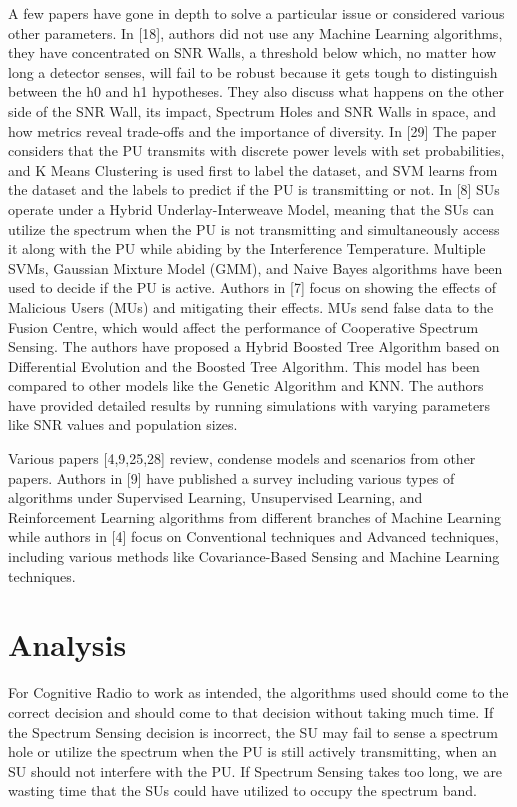 A few papers have gone in depth to solve a particular issue or considered various other parameters. In [18], authors did not use any Machine Learning algorithms, they have concentrated on SNR Walls, a threshold below which, no matter how long a detector senses, will fail to be robust because it gets tough to distinguish between the h0 and h1 hypotheses. They also discuss what happens on the other side of the SNR Wall, its impact, Spectrum Holes and SNR Walls in space, and how metrics reveal trade-offs and the importance of diversity. In [29] The paper considers that the PU transmits with discrete power levels with set probabilities, and K Means Clustering is used first to label the dataset, and SVM learns from the dataset and the labels to predict if the PU is transmitting or not. In [8] SUs operate under a Hybrid Underlay-Interweave Model, meaning that the SUs can utilize the spectrum when the PU is not transmitting and simultaneously access it along with the PU while abiding by the Interference Temperature. Multiple SVMs, Gaussian Mixture Model (GMM), and Naive Bayes algorithms have been used to decide if the PU is active. Authors in [7] focus on showing the effects of Malicious Users (MUs) and mitigating their effects. MUs send false data to the Fusion Centre, which would affect the performance of Cooperative Spectrum Sensing. The authors have proposed a Hybrid Boosted Tree Algorithm based on Differential Evolution and the Boosted Tree Algorithm. This model has been compared to other models like the Genetic Algorithm and KNN. The authors have provided detailed results by running simulations with varying parameters like SNR values and population sizes.

Various papers [4,9,25,28] review, condense models and scenarios from other papers. Authors in [9] have published a survey including various types of algorithms under Supervised Learning, Unsupervised Learning, and Reinforcement Learning algorithms from different branches of Machine Learning while authors in [4] focus on Conventional techniques and Advanced techniques, including various methods like Covariance-Based Sensing and Machine Learning techniques.


\section{Analysis}
For Cognitive Radio to work as intended, the algorithms used should come to the correct decision and should come to that decision without taking much time. If the Spectrum Sensing decision is incorrect, the SU may fail to sense a spectrum hole or utilize the spectrum when the PU is still actively transmitting, when an SU should not interfere with the PU. If Spectrum Sensing takes too long, we are wasting time that the SUs could have utilized to occupy the spectrum band.

